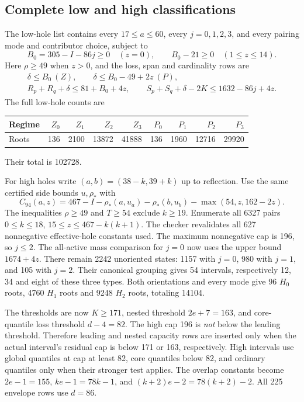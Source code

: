 \documentclass[11pt,a4paper]{article}
\theoremstyle{remark}
\begin{document}
\subsection{Complete low and high classifications}
The low-hole list contains every $17\le a\le60$, every $j=0,1,2,3$,
and every pairing mode and contributor choice, subject to
\[
 B_0=305-I-86j\ge0\quad(z=0),\qquad
 B_0-21\ge0\quad(1\le z\le14).
\]
Here $\rho\ge49$ when $z>0$, and the loss, span and cardinality rows are
\begin{gather*}
 \delta\le B_0\ (Z),\qquad\delta\le B_0-49+2z\ (P),\\
 R_p+R_q+\delta\le81+B_0+4z,\qquad
 S_p+S_q+\delta-2K\le1632-86j+4z.
\end{gather*}
The full low-hole counts are
\begin{center}\small
\begin{tabular}{lrrrrrrrr}
\toprule
Regime&$Z_0$&$Z_1$&$Z_2$&$Z_3$&$P_0$&$P_1$&$P_2$&$P_3$\\\midrule
Roots&136&2100&13872&41888&136&1960&12716&29920\\\bottomrule
\end{tabular}
\end{center}
Their total is 102728.

For high holes write $(a,b)=(38-k,39+k)$ up to reflection. Use the same
certified side bounds $u,\rho_*$ with
\[
 C_{94}(a,z)=467-I-\rho_*(a,u_a)-\rho_*(b,u_b)
                        -\max(54,z,162-2z).
\]
The inequalities $\rho\ge49$ and $T\ge54$ exclude $k\ge19$. Enumerate
all 6327 pairs $0\le k\le18$, $15\le z\le467-k(k+1)$. The checker
revalidates all 627 nonnegative effective-hole constants used.
The maximum nonnegative cap is 196, so $j\le2$. The all-active mass
comparison for $j=0$ now uses the upper bound $1674+4z$.
There remain 2242 unoriented states: 1157 with $j=0$, 980 with $j=1$,
and 105 with $j=2$. Their canonical grouping gives 54 intervals,
respectively 12, 34 and eight of these three types. Both orientations
and every mode give 96 $H_0$ roots, 4760 $H_1$ roots and 9248 $H_2$
roots, totaling 14104.

The thresholds are now $K\ge171$, nested threshold $2e+7=163$, and
core-quantile loss threshold $d-4=82$. The high cap 196 is \emph{not}
below the leading threshold. Therefore leading and nested capacity
rows are inserted only when the actual interval's residual cap is
below 171 or 163, respectively. High intervals use global quantiles
at cap at least 82, core quantiles below 82, and ordinary quantiles
only when their stronger test applies. The overlap constants become
$2e-1=155$, $ke-1=78k-1$, and $(k+2)e-2=78(k+2)-2$.
All 225 envelope rows use $d=86$.
\end{document}
